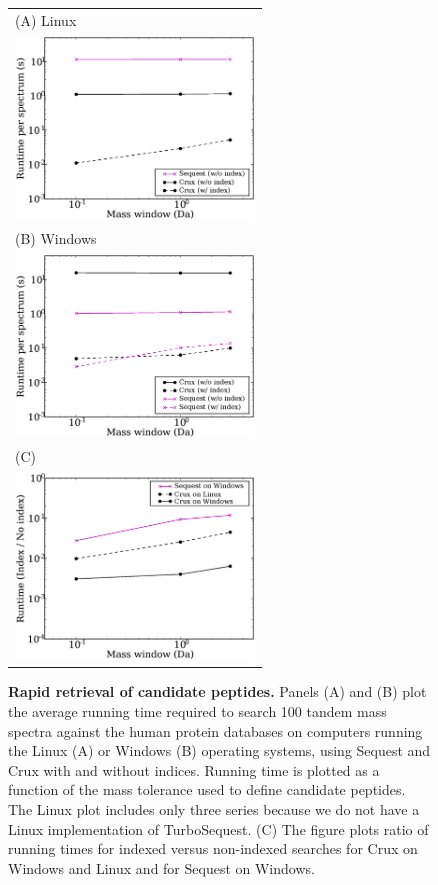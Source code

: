 \documentclass[12pt]{article}
\begin{document}
\begin{figure}
\centering
\begin{tabular}{l}
{\sf (A)} Linux \\
\includegraphics[width=2.5in]{../../results/paper-figure/index/indexing-human.eps} \\
{\sf (B)} Windows \\
\includegraphics[width=2.5in]{../../results/paper-figure/turbo-no-missed-human/indexing-yeast-windows.eps} \\
{\sf (C)} \\
\includegraphics[width=2.5in]{../../results/paper-figure/comparison/ratio.eps} \\
\end{tabular}
\caption{{\bf Rapid retrieval of candidate peptides.}  Panels (A) and
  (B) plot the average running time required to search 100 tandem mass
  spectra against the human protein databases on computers running the
  Linux ({\sf A}) or Windows ({\sf B}) operating systems, using {\sc
  Sequest} and Crux with and without indices.  Running time is plotted
  as a function of the mass tolerance used to define candidate
  peptides. The Linux plot includes only three series because we do
  not have a Linux implementation of Turbo{\sc Sequest}.  {\sf (C)} The
  figure plots ratio of running times for indexed versus non-indexed
  searches for Crux on Windows and Linux and for {\sc Sequest} on Windows.
  \label{figure:indexing}}
\end{figure}
\end{document}
